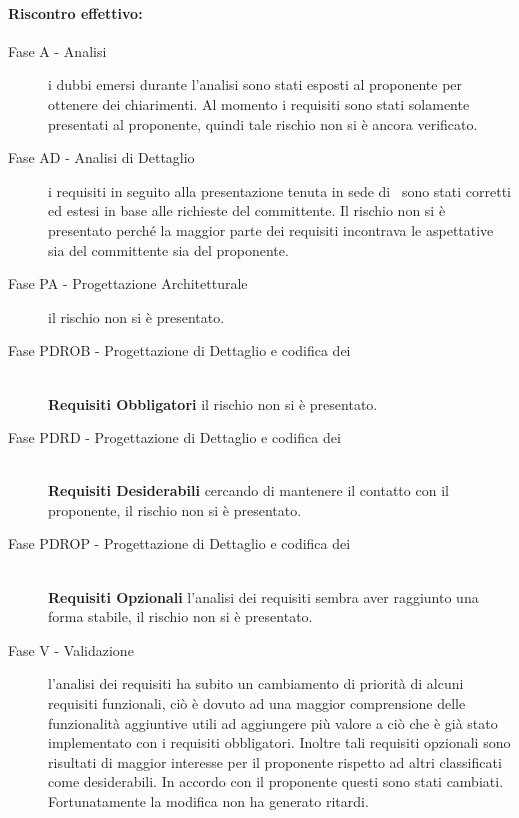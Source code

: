 \documentclass[../PianoProgetto.tex]{subfiles}
\begin{document}
	\paragraph*{Riscontro effettivo:}
		\begin{description}
			\item[Fase A - Analisi] i dubbi emersi durante l'analisi sono stati esposti al proponente per ottenere dei chiarimenti. Al momento i requisiti sono stati solamente presentati al proponente, quindi tale rischio non si è ancora verificato.
			\item[Fase AD - Analisi di Dettaglio]  i requisiti in seguito alla presentazione tenuta in sede di \revisionedeirequisiti\ sono stati corretti ed estesi in base alle richieste del committente. Il rischio non si è presentato perché la maggior parte dei requisiti incontrava le aspettative sia del committente sia del proponente. 
			\item[Fase PA - Progettazione Architetturale] il rischio non si è presentato.
			\item[Fase PDROB - Progettazione di Dettaglio e codifica dei]  \ \\
					\textbf{Requisiti Obbligatori} il rischio non si è presentato.
			\item[Fase PDRD - Progettazione di Dettaglio e codifica dei] \ \\
					\textbf{Requisiti Desiderabili} cercando di mantenere il contatto con il proponente, il rischio non si è presentato.
			\item[Fase PDROP - Progettazione di Dettaglio e codifica dei]  \ \\
					\textbf{Requisiti Opzionali} l'analisi dei requisiti sembra aver raggiunto una forma stabile, il rischio non si è presentato.
			\item[Fase V - Validazione] l'analisi dei requisiti ha subito un cambiamento di priorità di alcuni requisiti funzionali, ciò è dovuto ad una maggior comprensione delle funzionalità aggiuntive utili ad aggiungere più valore a ciò che è già stato implementato con i requisiti obbligatori. Inoltre tali requisiti opzionali sono risultati di maggior interesse per il proponente rispetto ad altri classificati come desiderabili. In accordo con il proponente questi sono stati cambiati. Fortunatamente la modifica non ha generato ritardi.
		\end{description}

			
\end{document}
